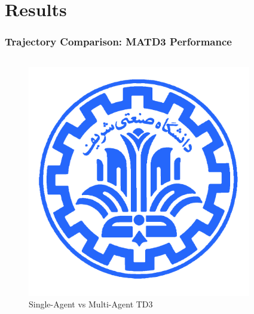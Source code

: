 \documentclass[
    11pt, %
    aspectratio=169, %
]{beamer}
\begin{document}
\section{Results}

\begin{frame}
	\frametitle{Trajectory Comparison: MATD3 Performance}
	
	\begin{columns}[t]
		\begin{column}{0.5\textwidth}
			\begin{figure}
				\centering
				\includegraphics[width=\textwidth]{td3_trajectory_comparison.png}
				\caption{Single-Agent vs Multi-Agent TD3}
			\end{figure}
		\end{column}
		\begin{column}{0.5\textwidth}
			\begin{figure}
				\centering

\end{figure}
\end{column}
\end{columns}
\end{frame}
\end{document}
